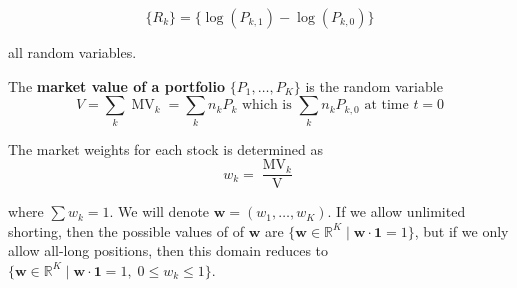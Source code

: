 \documentclass{article}
\DeclareMathOperator{\MV}{MV}
\DeclareMathOperator{\V}{V}
\begin{document}
  \begin{equation}
    \{R_k\} = \{\log(P_{k, 1}) - \log(P_{k, 0})\}
  \end{equation}

  all random variables. 

  \begin{definition}
    The \textbf{market value of a portfolio} $\{P_1, \ldots, P_K\}$ is the random variable 
    \begin{equation}
      V = \sum_{k} \MV_{k} = \sum_k n_{k} P_{k} \text{ which is } \sum_k n_k P_{k, 0} \text{ at time } t = 0
    \end{equation}

    The market weights for each stock is determined as 
    \begin{equation}
      w_{k} = \frac{\MV_{k}}{\V}
    \end{equation}

    where $\sum w_{k} = 1$. We will denote $\mathbf{w} = (w_1, \ldots, w_K)$. If we allow unlimited shorting, then the possible values of of $\mathbf{w}$ are $\{\mathbf{w} \in \mathbb{R}^K \mid \mathbf{w} \cdot \mathbf{1} = 1\}$, but if we only allow all-long positions, then this domain reduces to $\{\mathbf{w} \in \mathbb{R}^K \mid \mathbf{w} \cdot \mathbf{1} = 1, \; 0 \leq w_k \leq 1\}$. 
  \end{definition}
\end{document}
